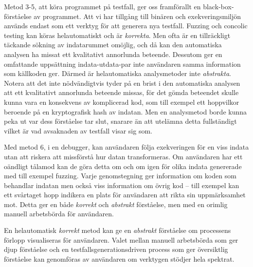 Metod 3-5, att köra programmet på testfall, ger oss framförallt en black-box-förståelse av
programmet. Att vi har tillgång till binären och exekveringsmiljön används endast som ett verktyg
för att generera nya testfall. Fuzzing och concolic testing kan köras helautomatiskt och är
\textit{korrekta}. Men ofta är en tillräckligt täckande sökning av indatarummet omöjlig, och då kan
den automatiska analysen ha missat ett kvalitativt annorlunda beteende. Dessutom ger en omfattande
uppsättning indata-utdata-par inte användaren samma information som källkoden ger. Därmed är
helautomatiska analysmetoder inte \textit{abstrakta}. Notera att det inte nödvändigtvis tyder på en
brist i den automatiska analysen att ett kvalitativt annorlunda beteende missas, för det gömda
beteendet skulle kunna vara en konsekvens av komplicerad kod, som till exempel ett hoppvilkor
beroende på en kryptografisk hash av indatan. Men en analysmetod borde kunna peka ut var dess
förståelse tar slut, snarare än att utelämna detta fullständigt vilket är vad avsaknaden av testfall
visar sig som.

Med metod 6, i en debugger, kan användaren följa exekveringen för en viss indata utan att riskera
att missförstå hur datan transformeras. Om användaren har ett oändligt tålamod kan de göra detta om
och om igen för olika indata genererade med till exempel fuzzing. Varje genomstegning ger
information om koden som behandlar indatan men också viss information om övrig kod -- till exempel
kan ett svårtaget hopp indikera en plats för användaren att rikta sin uppmärksamhet mot. Detta ger
en både \textit{korrekt} och \textit{abstrakt} förståelse, men med en orimlig manuell arbetsbörda
för användaren.

En helautomatisk \textit{korrekt} metod kan ge en \textit{abstrakt} förståelse om processens förlopp
visualiseras för användaren. Valet mellan manuell arbetsbörda som ger djup förståelse och en
testfallsgenerationsdriven process som ger översiktlig förståelse kan genomföras av användaren om
verktygen stödjer hela spektrat.
